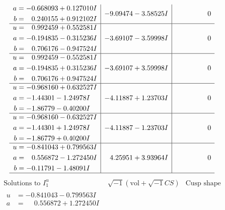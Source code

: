 \documentclass[1p]{elsarticle_modified}
\theoremstyle{definition}
\newcommand{\I}{\sqrt{-1}}
\begin{document}
$$\begin{array}{c|c|c}
\begin{aligned}
a &= -0.668093 + 0.127010 I \\
b &= \phantom{-}0.240155 + 0.912102 I\end{aligned}
 & -9.09474 - 3.58525 I & \phantom{-0.000000 } 0 \\ \hline\begin{aligned}
u &= \phantom{-}0.992459 + 0.552581 I \\
a &= -0.194835 - 0.315236 I \\
b &= \phantom{-}0.706176 - 0.947524 I\end{aligned}
 & -3.69107 - 3.59998 I & \phantom{-0.000000 } 0 \\ \hline\begin{aligned}
u &= \phantom{-}0.992459 - 0.552581 I \\
a &= -0.194835 + 0.315236 I \\
b &= \phantom{-}0.706176 + 0.947524 I\end{aligned}
 & -3.69107 + 3.59998 I & \phantom{-0.000000 } 0 \\ \hline\begin{aligned}
u &= -0.968160 + 0.632527 I \\
a &= -1.44301 - 1.24978 I \\
b &= -1.86779 - 0.40200 I\end{aligned}
 & -4.11887 + 1.23703 I & \phantom{-0.000000 } 0 \\ \hline\begin{aligned}
u &= -0.968160 - 0.632527 I \\
a &= -1.44301 + 1.24978 I \\
b &= -1.86779 + 0.40200 I\end{aligned}
 & -4.11887 - 1.23703 I & \phantom{-0.000000 } 0 \\ \hline\begin{aligned}
u &= -0.841043 + 0.799563 I \\
a &= \phantom{-}0.556872 - 1.272450 I \\
b &= -0.11791 - 1.48091 I\end{aligned}
 & \phantom{-}4.25951 + 3.93964 I & \phantom{-0.000000 } 0\\
 \hline 
 \end{array}$$\newpage$$\begin{array}{c|c|c}  
\text{Solutions to }I^u_{1}& \I (\text{vol} + \sqrt{-1}CS) & \text{Cusp shape}\\
 \hline 
\begin{aligned}
u &= -0.841043 - 0.799563 I \\
a &= \phantom{-}0.556872 + 1.272450 I \\

\end{aligned}
\end{array}$$
\end{document}
